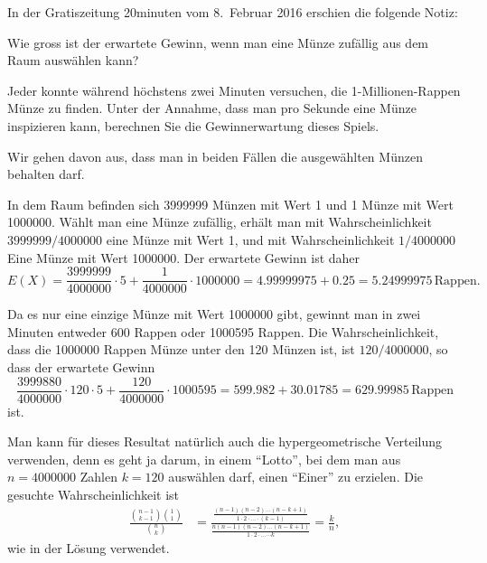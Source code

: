 In der Gratiszeitung 20minuten vom 8.~Februar 2016 erschien die folgende
Notiz:
\begin{center}
\end{center}
\begin{teilaufgaben}
\item Wie gross ist der erwartete Gewinn, wenn man eine Münze zufällig
aus dem Raum auswählen kann?
\item
Jeder konnte während höchstens zwei Minuten versuchen, die 1-Millionen-Rappen
Münze zu finden. 
Unter der Annahme, dass man pro Sekunde eine Münze inspizieren kann, 
berechnen Sie die Gewinnerwartung dieses Spiels.
\end{teilaufgaben}
Wir gehen davon aus, dass man in beiden Fällen die ausgewählten Münzen
behalten darf.


\begin{loesung}
\begin{teilaufgaben}
\item
In dem Raum befinden sich 3999999 Münzen mit Wert 1 und 1 Münze mit
Wert 1000000.
Wählt man eine Münze zufällig, erhält man mit Wahrscheinlichkeit
$3999999/4000000$ eine Münze mit Wert 1, und mit Wahrscheinlichkeit
$1/4000000$ Eine Münze mit Wert 1000000.
Der erwartete Gewinn ist daher
\[
E(X) = \frac{3999999}{4000000}\cdot 5 + \frac{1}{4000000}\cdot 1000000
=4.99999975 + 0.25 = 5.24999975\,\text{Rappen}.
\]
\item
Da es nur eine einzige Münze mit Wert 1000000 gibt, gewinnt man
in zwei Minuten entweder 600 Rappen oder 1000595 Rappen.
Die Wahrscheinlichkeit, dass die 1000000 Rappen Münze unter den
120 Münzen ist, ist $120/4000000$, so dass der erwartete Gewinn
\[
\frac{3999880}{4000000}\cdot 120\cdot 5
+
\frac{120}{4000000}\cdot 1000595
=
599.982 + 30.01785=629.99985\,\text{Rappen}
\]
ist.
\end{teilaufgaben}
\end{loesung}

\begin{diskussion}
Man kann für dieses Resultat natürlich auch die hypergeometrische
Verteilung verwenden, denn es geht ja darum, in einem ``Lotto'', bei dem
man aus $n=4000000$ Zahlen $k=120$ auswählen darf, einen ``Einer''
zu erzielen.
Die gesuchte Wahrscheinlichkeit ist
\begin{align*}
\frac{\displaystyle\binom{n-1}{k-1}\binom{1}{1}}{\displaystyle\binom{n}{k}}
&=
\frac{\displaystyle\frac{(n-1)(n-2)\dots(n-k+1)}{1\cdot 2\cdot\dots\cdot (k-1)}}%
{\displaystyle\frac{n(n-1)(n-2)\dots(n-k+1)}{1\cdot 2\cdot\dots\cdots k}}
=\frac{k}{n},
\end{align*}
wie in der Lösung verwendet.
\end{diskussion}

